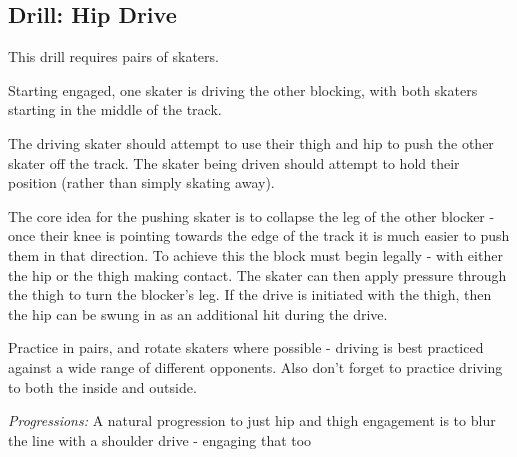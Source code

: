 \subsection*{Drill: Hip Drive}
\label{drill:drives/hip}

This drill requires pairs of skaters. 

Starting engaged, one skater is driving the other blocking, with both skaters starting in the middle of the track. 

The driving skater should attempt to use their thigh and hip to push the other skater off the track. 
The skater being driven should attempt to hold their position (rather than simply skating away).


The core idea for the pushing skater is to collapse the leg of the other blocker - once their knee is pointing towards the edge of the track it is much easier to push them in that direction. 
To achieve this the block must begin legally - with either the hip or the thigh making contact. The skater can then apply pressure through the thigh to turn the blocker's leg.
If the drive is initiated with the thigh, then the hip can be swung in as an additional hit during the drive.

Practice in pairs, and rotate skaters where possible - driving is best practiced against a wide range of different opponents.
Also don't forget to practice driving to both the inside and outside.

{\it Progressions: }
A natural progression to just hip and thigh engagement is to blur the line with a shoulder drive - engaging that too

